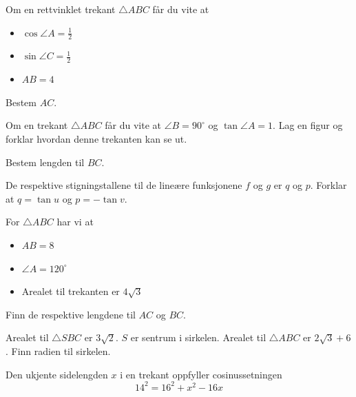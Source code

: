 Om en rettvinklet trekant $\triangle ABC$ får du vite at
\begin{itemize}
	\item $\cos \angle A=\frac{1}{2}$
	\item $\sin \angle C=\frac{1}{2}$
	\item $AB=4$
\end{itemize}
Bestem $AC$.


Om en trekant $\triangle ABC$ får du vite at $\angle B=90^\circ$ og $\tan \angle A=1$. Lag en figur og forklar hvordan denne trekanten kan se ut.

Bestem lengden til $ BC $.

 \vs \vspace{4pt}


\newpage


De respektive stigningstallene til de lineære funksjonene $f$ og $g$ er $q$ og $p$.
Forklar at $q=\tan u$ og $p=-\tan v$.

For $\triangle ABC$ har vi at
\begin{itemize}
	\item $AB=8$
	\item $\angle A=120^\circ$
	\item Arealet til trekanten er $4\sqrt{3}$
\end{itemize}
Finn de respektive lengdene til $AC$ og $BC$.


Arealet til $\triangle SBC$ er $3\sqrt{2}$. $S$ er sentrum i sirkelen.
\newpage
{}
Arealet til $\triangle ABC$ er $2\sqrt{3}+6$. Finn radien til sirkelen.

Den ukjente sidelengden $x$ i en trekant oppfyller cosinussetningen
\[ 14^2 = 16^2+x^2-16x\] 

